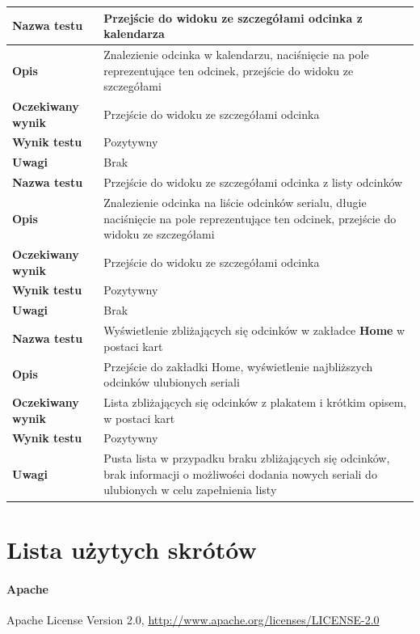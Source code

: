 \documentclass[10pt,a4paper]{article}
\begin{document}
\begin{tabularx}{\textwidth}{|l|X|}
	\hhline{==}
	\textbf{Nazwa testu} & Przejście do widoku ze szczegółami odcinka z kalendarza \\
	\hline
	\textbf{Opis} & Znalezienie odcinka w kalendarzu, naciśnięcie na pole reprezentujące ten odcinek, przejście do widoku ze szczegółami \\
	\hline
	\textbf{Oczekiwany wynik} & Przejście do widoku ze szczegółami odcinka \\
	\hline
	\textbf{Wynik testu} & Pozytywny \\
	\hline
	\textbf{Uwagi} & Brak \\
	\hhline{==}
	\textbf{Nazwa testu} & Przejście do widoku ze szczegółami odcinka z listy odcinków \\
	\hline
	\textbf{Opis} & Znalezienie odcinka na liście odcinków serialu, długie naciśnięcie na pole reprezentujące ten odcinek, przejście do widoku ze szczegółami \\
	\hline
	\textbf{Oczekiwany wynik} & Przejście do widoku ze szczegółami odcinka \\
	\hline
	\textbf{Wynik testu} & Pozytywny \\
	\hline
	\textbf{Uwagi} & Brak \\
	\hhline{==}
	\textbf{Nazwa testu} & Wyświetlenie zbliżających się odcinków w zakładce \textbf{Home} w postaci kart \\
	\hline
	\textbf{Opis} & Przejście do zakładki Home, wyświetlenie najbliższych odcinków ulubionych seriali \\
	\hline
	\textbf{Oczekiwany wynik} & Lista zbliżających się odcinków z plakatem i krótkim opisem, w postaci kart \\
	\hline
	\textbf{Wynik testu} & Pozytywny \\
	\hline
	\textbf{Uwagi} & Pusta lista w przypadku braku zbliżających się odcinków, brak informacji o możliwości dodania nowych seriali do ulubionych w celu zapełnienia listy \\
	\hline
\end{tabularx}

\section{Lista użytych skrótów}
\label{abbr:lic}
\paragraph{Apache} Apache License Version 2.0, \url{http://www.apache.org/licenses/LICENSE-2.0}
\end{document}

